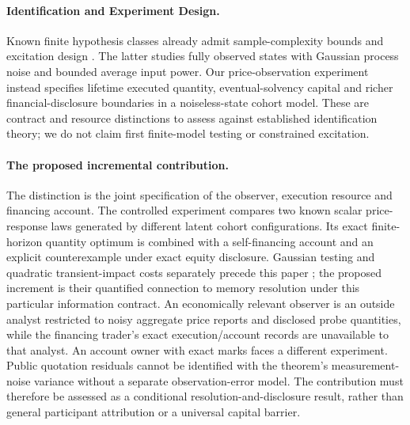 \documentclass[12pt]{article}
\theoremstyle{definition}
\theoremstyle{remark}
\begin{document}
\paragraph{Identification and Experiment Design.}
Known finite hypothesis classes already admit sample-complexity bounds and excitation design \citep{chatzikiriakos2024finite,chatzikiriakos2026active}. The latter studies fully observed states with Gaussian process noise and bounded average input power. Our price-observation experiment instead specifies lifetime executed quantity, eventual-solvency capital and richer financial-disclosure boundaries in a noiseless-state cohort model. These are contract and resource distinctions to assess against established identification theory; we do not claim first finite-model testing or constrained excitation.

\paragraph{The proposed incremental contribution.}
The distinction is the joint specification of the observer, execution resource and financing account. The controlled experiment compares two known scalar price-response laws generated by different latent cohort configurations. Its exact finite-horizon quantity optimum is combined with a self-financing account and an explicit counterexample under exact equity disclosure. Gaussian testing and quadratic transient-impact costs separately precede this paper \citep{chatzikiriakos2026active,alfonsi2016matrix}; the proposed increment is their quantified connection to memory resolution under this particular information contract. An economically relevant observer is an outside analyst restricted to noisy aggregate price reports and disclosed probe quantities, while the financing trader's exact execution/account records are unavailable to that analyst. An account owner with exact marks faces a different experiment. Public quotation residuals cannot be identified with the theorem's measurement-noise variance without a separate observation-error model. The contribution must therefore be assessed as a conditional resolution-and-disclosure result, rather than general participant attribution or a universal capital barrier.
\end{document}
